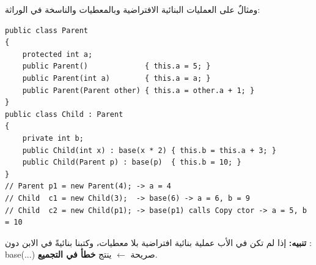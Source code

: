 \documentclass[14pt]{extarticle}
\begin{document}
\begin{center}
\begin{english}
\end{english}
\end{center}

ومثالٌ على العمليات البنائية الافتراضية وبالمعطيات والناسخة في الوراثة:

\begin{boxCode}
\begin{english}
\begin{verbatim}
public class Parent
{
    protected int a;
    public Parent()             { this.a = 5; }
    public Parent(int a)        { this.a = a; }
    public Parent(Parent other) { this.a = other.a + 1; }
}
public class Child : Parent
{
    private int b;
    public Child(int x) : base(x * 2) { this.b = this.a + 3; }
    public Child(Parent p) : base(p)  { this.b = 10; }
}
// Parent p1 = new Parent(4); -> a = 4
// Child  c1 = new Child(3);  -> base(6) -> a = 6, b = 9
// Child  c2 = new Child(p1); -> base(p1) calls Copy ctor -> a = 5, b = 10
\end{verbatim}
\end{english}
\end{boxCode}

\textbf{تنبيه:} إذا لم تكن في الأب عملية بنائية افتراضية بلا معطيات، وكتبنا بنائيةً في الابن دون \textenglish{: base(...)} صريحة $\leftarrow$ ينتج \textbf{خطأ في التجميع}.
\end{document}

